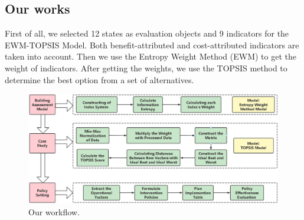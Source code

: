 \subsection{Our works}
First of all, we selected 12 states as evaluation objects and 9 indicators for the EWM-TOPSIS Model. Both benefit-attributed and cost-attributed indicators are taken into account. Then we use the Entropy Weight Method (EWM) to get the weight of indicators. After getting the weights, we use the TOPSIS method to determine the best option from a set of alternatives.


\begin{figure}[H]\centering
    \includegraphics[width=1\textwidth]{figures/Flowchart}
    \caption{Our workflow.} \label{fig:figure1}
\end{figure}



